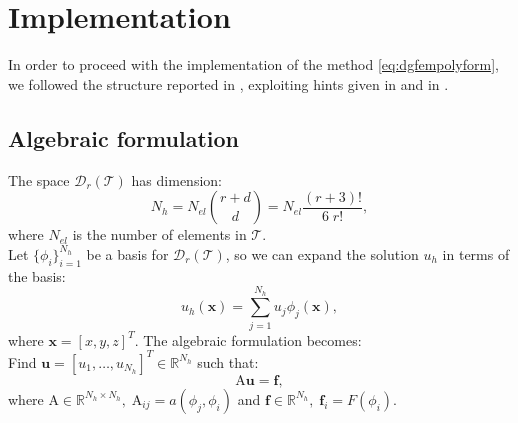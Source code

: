 \documentclass[12pt, a4paper]{article}
\theoremstyle{definition}
\theoremstyle{plain}
\theoremstyle{plain}
\begin{document}
\section{Implementation}\label{sec:imp}
In order to proceed with the implementation of the method \eqref{eq:dgfempolyform}, we followed the structure reported in \cite{riviere}, exploiting hints given in \cite{hpmet} and in \cite{hest}.
\subsection{Algebraic formulation}
The space $\mathcal{D}_r(\mathcal{T})$ has dimension:
\begin{equation*}
	N_h = N_{el} \binom{r+d}{d} = N_{el} \frac{(r+3)!}{6\;r!},
\end{equation*}
where $N_{el}$ is the number of elements in $\mathcal{T}$.\\
Let $\{ \phi_i \}^{N_h}_{i=1}$ be a basis for $\mathcal{D}_r(\mathcal{T})$, so we can expand the solution $u_h$ in terms of the basis:
\begin{equation*}
	u_h(\mathbf{x}) = \sum_{j = 1}^{N_h} u_j \phi_j(\mathbf{x}),
\end{equation*}
where $\mathbf{x}=[x, y, z]^T$. The algebraic formulation becomes:\\
Find $\mathbf{u} = [u_1, \dots, u_{N_h}]^T \in \mathbb{R}^{N_h} $ such that:
\begin{equation*}
	\mathrm{A}\mathbf{u} = \mathbf{f},
\end{equation*}
where $\mathrm{A} \in \mathbb{R}^{N_h \times N_h}, \; \mathrm{A}_{ij} = a(\phi_j, \phi_i)$ and $\mathbf{f} \in \mathbb{R}^{N_h}, \; \mathbf{f}_i = F(\phi_i)$.
\end{document}
